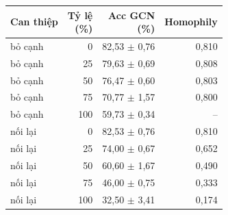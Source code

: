 \begin{tabular}{lrrr}
\toprule
Can thiệp & \makecell[r]{Tỷ lệ\\(\%)} & \makecell[r]{Acc GCN\\(\%)} & Homophily \\
\midrule
bỏ cạnh & 0 & 82{,}53 $\pm$ 0{,}76 & 0{,}810 \\
bỏ cạnh & 25 & 79{,}63 $\pm$ 0{,}69 & 0{,}808 \\
bỏ cạnh & 50 & 76{,}47 $\pm$ 0{,}60 & 0{,}803 \\
bỏ cạnh & 75 & 70{,}77 $\pm$ 1{,}57 & 0{,}800 \\
bỏ cạnh & 100 & 59{,}73 $\pm$ 0{,}34 & -- \\
nối lại & 0 & 82{,}53 $\pm$ 0{,}76 & 0{,}810 \\
nối lại & 25 & 74{,}00 $\pm$ 0{,}67 & 0{,}652 \\
nối lại & 50 & 60{,}60 $\pm$ 1{,}67 & 0{,}490 \\
nối lại & 75 & 46{,}00 $\pm$ 0{,}75 & 0{,}333 \\
nối lại & 100 & 32{,}50 $\pm$ 3{,}41 & 0{,}174 \\
\bottomrule
\end{tabular}
